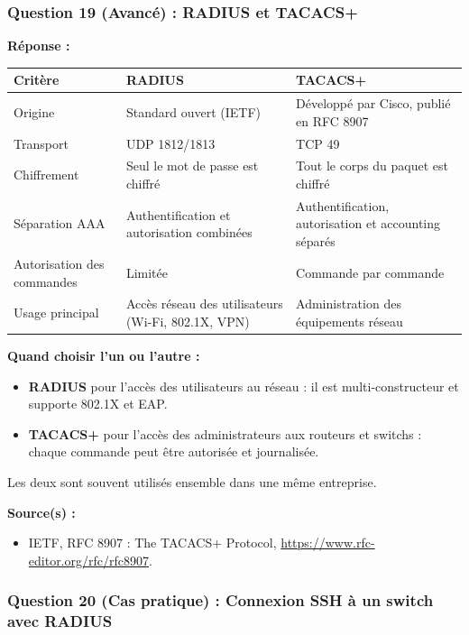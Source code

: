 \documentclass[12pt,a4paper]{article}
\newcommand{\reponse}{\textbf{Réponse :}\par}
\newcommand{\sources}{\textbf{Source(s) :}}
\begin{document}
\subsubsection*{Question 19 (Avancé) : RADIUS et TACACS+}

\reponse
\begin{longtable}{|L{3.4cm}|L{5.6cm}|L{5.6cm}|}
\hline
\textbf{Critère} & \textbf{RADIUS} & \textbf{TACACS+} \\ \hline
\endhead
Origine & Standard ouvert (IETF) & Développé par Cisco, publié en
RFC 8907 \\ \hline
Transport & UDP 1812/1813 & TCP 49 \\ \hline
Chiffrement & Seul le mot de passe est chiffré & Tout le corps du
paquet est chiffré \\ \hline
Séparation AAA & Authentification et autorisation combinées &
Authentification, autorisation et accounting séparés \\ \hline
Autorisation des commandes & Limitée & Commande par commande \\ \hline
Usage principal & Accès réseau des utilisateurs (Wi-Fi, 802.1X, VPN) &
Administration des équipements réseau \\ \hline
\end{longtable}

\textbf{Quand choisir l'un ou l'autre :}
\begin{itemize}
    \item \textbf{RADIUS} pour l'accès des utilisateurs au réseau : il
    est multi-constructeur et supporte 802.1X et EAP.
    \item \textbf{TACACS+} pour l'accès des administrateurs aux routeurs
    et switchs : chaque commande peut être autorisée et journalisée.
\end{itemize}
Les deux sont souvent utilisés ensemble dans une même entreprise.

\sources
\begin{itemize}
    \item IETF, RFC 8907 : The TACACS+ Protocol,
    \url{https://www.rfc-editor.org/rfc/rfc8907}.
\end{itemize}

\subsubsection*{Question 20 (Cas pratique) : Connexion SSH à un switch avec RADIUS}
\end{document}

